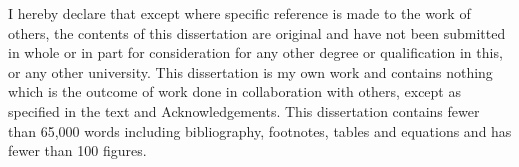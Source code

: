
\begin{declaration}

I hereby declare that except where specific reference is made to the work of others, the contents of this dissertation are original and have not been submitted in whole or in part for consideration for any other degree or qualification in this, or any other university. This dissertation is my own work and contains nothing which is the outcome of work done in collaboration with others, except as specified in the text and Acknowledgements. This dissertation contains fewer than 65,000 words including bibliography, footnotes, tables and equations and has fewer than 100 figures.


\end{declaration}

